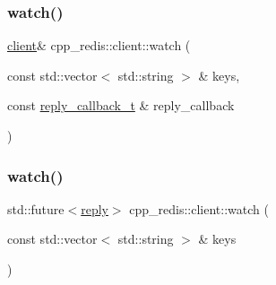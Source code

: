 \mbox{\label{classcpp__redis_1_1client_a7faae4f59e4b7f5b5003dcfbbf04af89}} 
\subsubsection{\texorpdfstring{watch()}{watch()}\hspace{0.1cm}{\footnotesize\ttfamily [1/2]}}
{\footnotesize\ttfamily \hyperlink{classcpp__redis_1_1client}{client}\& cpp\+\_\+redis\+::client\+::watch (\begin{DoxyParamCaption}\item[{const std\+::vector$<$ std\+::string $>$ \&}]{keys,  }\item[{const \hyperlink{classcpp__redis_1_1client_a061a1140d36d2eaeda82b09a0bb3f9f2}{reply\+\_\+callback\+\_\+t} \&}]{reply\+\_\+callback }\end{DoxyParamCaption})}

\mbox{\label{classcpp__redis_1_1client_a437606353878a903033ced5cb56ed07c}} 
\subsubsection{\texorpdfstring{watch()}{watch()}\hspace{0.1cm}{\footnotesize\ttfamily [2/2]}}
{\footnotesize\ttfamily std\+::future$<$\hyperlink{classcpp__redis_1_1reply}{reply}$>$ cpp\+\_\+redis\+::client\+::watch (\begin{DoxyParamCaption}\item[{const std\+::vector$<$ std\+::string $>$ \&}]{keys }\end{DoxyParamCaption})}

\mbox{\label{classcpp__redis_1_1client_aaea3a3c79956cabb6709fb6cd3e01739}} 
